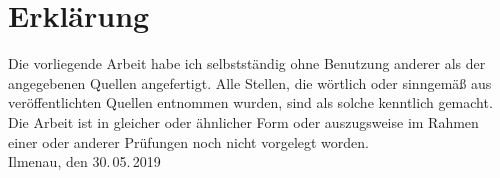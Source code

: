 %
%
%
%

\chapter*{Erklärung}

Die vorliegende Arbeit habe ich selbstständig ohne Benutzung anderer als der
angegebenen Quellen angefertigt. Alle Stellen, die wörtlich oder sinngemäß
aus veröffentlichten Quellen entnommen wurden, sind als solche
kenntlich gemacht. Die Arbeit ist in gleicher oder ähnlicher Form oder
auszugsweise im Rahmen einer oder anderer Prüfungen noch nicht vorgelegt
worden.
\\[2cm]
Ilmenau, den 30.\,05.\,2019\hfill \namedesautors
